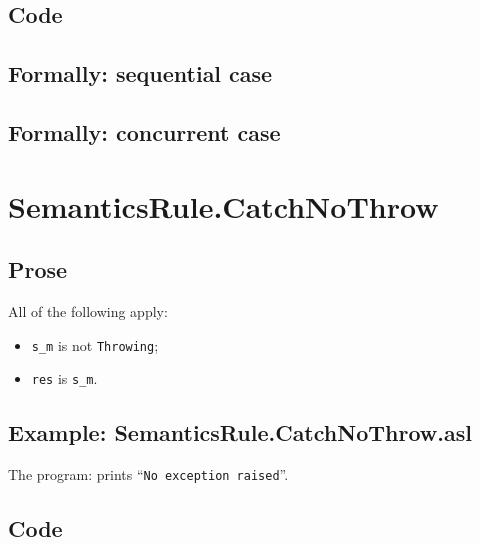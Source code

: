\documentclass{book}
\begin{document}
  \subsection{Code}

\begin{emptyformal}
  \subsection{Formally: sequential case}

  \subsection{Formally: concurrent case}
\end{emptyformal}


\section{SemanticsRule.CatchNoThrow \label{sec:SemanticsRule.CatchNoThrow}}

    \subsection{Prose}
    All of the following apply:
    \begin{itemize}
    \item \texttt{s\_m} is not \texttt{Throwing};
    \item \texttt{res} is \texttt{s\_m}.
    \end{itemize}

    \subsection{Example: SemanticsRule.CatchNoThrow.asl}
    The program:
    prints ``\texttt{No exception raised}''.

  \subsection{Code}
\end{document}
